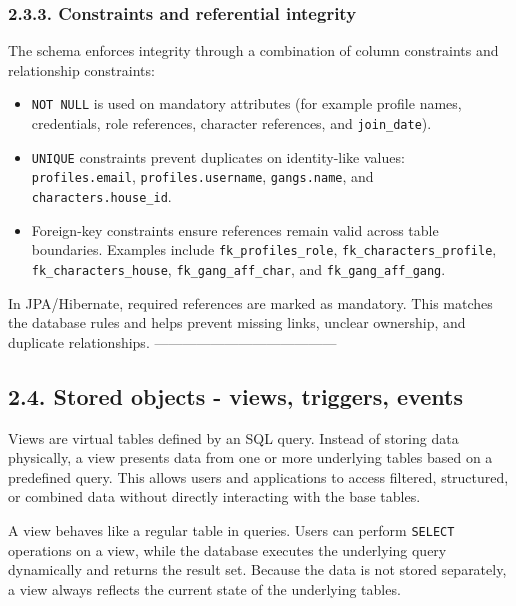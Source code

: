 \hypertarget{constraints-and-referential-integrity}{%
\subsubsection{2.3.3. Constraints and referential
integrity}\label{constraints-and-referential-integrity}}

The schema enforces integrity through a combination of column
constraints and relationship constraints:

\begin{itemize}
\tightlist
\item
  \texttt{NOT\ NULL} is used on mandatory attributes (for example
  profile names, credentials, role references, character references, and
  \texttt{join\_date}).
\item
  \texttt{UNIQUE} constraints prevent duplicates on identity-like
  values: \texttt{profiles.email}, \texttt{profiles.username},
  \texttt{gangs.name}, and \texttt{characters.house\_id}.
\item
  Foreign-key constraints ensure references remain valid across table
  boundaries. Examples include \texttt{fk\_profiles\_role},
  \texttt{fk\_characters\_profile}, \texttt{fk\_characters\_house},
  \texttt{fk\_gang\_aff\_char}, and \texttt{fk\_gang\_aff\_gang}.
\end{itemize}

In JPA/Hibernate, required references are marked as mandatory. This
matches the database rules and helps prevent missing links, unclear
ownership, and duplicate relationships.
---------------------------------------

\newpage

\hypertarget{stored-objects---views-triggers-events}{%
\subsection{2.4. Stored objects - views, triggers,
events}\label{stored-objects---views-triggers-events}}

Views are virtual tables defined by an SQL query. Instead of storing
data physically, a view presents data from one or more underlying tables
based on a predefined query. This allows users and applications to
access filtered, structured, or combined data without directly
interacting with the base tables.

A view behaves like a regular table in queries. Users can perform
\texttt{SELECT} operations on a view, while the database executes the
underlying query dynamically and returns the result set. Because the
data is not stored separately, a view always reflects the current state
of the underlying tables.

